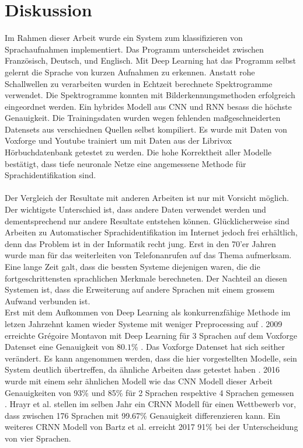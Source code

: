 \section{Diskussion}
Im Rahmen dieser Arbeit wurde ein System zum klassifizieren von Sprachaufnahmen implementiert. Das Programm unterscheidet zwischen Französisch, Deutsch, und Englisch. Mit Deep Learning hat das Programm selbst gelernt die Sprache von kurzen Aufnahmen zu erkennen. Anstatt rohe Schallwellen zu verarbeiten wurden in Echtzeit berechnete Spektrogramme verwendet. Die Spektrogramme konnten mit Bilderkennungsmethoden erfolgreich eingeordnet werden. Ein hybrides Modell aus CNN und RNN besass die höchste Genauigkeit. Die Trainingsdaten wurden wegen fehlenden maßgeschneiderten Datensets aus verschiednen Quellen selbst kompiliert. Es wurde mit Daten von Voxforge und Youtube trainiert um mit Daten aus der Librivox Hörbuchdatenbank getestet zu werden. Die hohe Korrektheit aller Modelle bestätigt, dass tiefe neuronale Netze eine angemessene Methode für Sprachidentifikation sind.
\\ \\
Der Vergleich der Resultate mit anderen Arbeiten ist nur mit Vorsicht möglich. Der wichtigste Unterschied ist, dass andere Daten verwendet werden und dementsprechend nur andere Resultate entstehen können. Glücklicherweise sind Arbeiten zu Automatischer Sprachidentifikation im Internet jedoch frei erhältlich, denn das Problem ist in der Informatik recht jung. Erst in den 70'er Jahren wurde man für das weiterleiten von Telefonanrufen auf das Thema aufmerksam. Eine lange Zeit galt, dass die bessten Systeme diejenigen waren, die die fortgeschrittensten sprachlichen Merkmale berechneten. Der Nachteil an diesen Systemen ist, dass die Erweiterung auf andere Sprachen mit einem grossem Aufwand verbunden ist. \parencite{history}
\\
Erst mit dem Aufkommen von Deep Learning als konkurrenzfähige Methode im letzen Jahrzehnt kamen wieder Systeme mit weniger Preprocessing auf \parencite{chollet}. 2009 erreichte Grégoire Montavon mit Deep Learning für 3 Sprachen auf dem Voxforge Datenset eine Genauigkeit von $80.1\%$ \parencite{montavon}. Das Voxforge Datenset hat sich seither verändert. Es kann angenommen werden, dass die hier vorgestellten Modelle, sein System deutlich übertreffen, da ähnliche Arbeiten dass getestet haben \parencite{iLID}. 2016 wurde mit einem sehr ähnlichen Modell wie das CNN Modell dieser Arbeit Genauigkeiten von 93\% und 85\% für 2 Sprachen respektive 4 Sprachen gemessen \parencite{iLID}. Hrayr et al. \parencite{yerevann} stellen im selben Jahr ein CRNN Modell für einen Wettbewerb vor, dass zwischen 176 Sprachen mit 99.67\% Genauigkeit differenzieren kann. Ein weiteres CRNN Modell von Bartz et al. \parencite{crnn} erreicht 2017 91\% bei der Unterscheidung von vier Sprachen.
